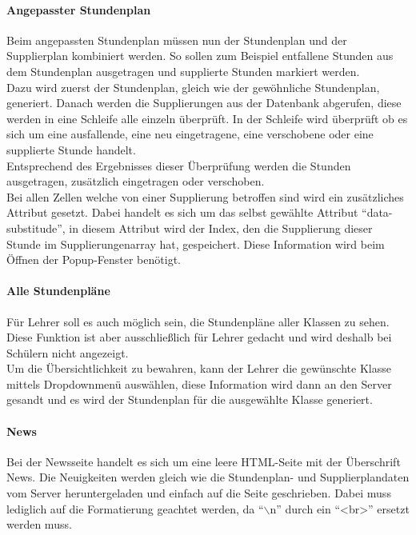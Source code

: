 \paragraph{Angepasster Stundenplan\\}
Beim angepassten Stundenplan müssen nun der Stundenplan und der Supplierplan kombiniert werden. So sollen zum Beispiel entfallene Stunden aus dem Stundenplan ausgetragen und supplierte Stunden markiert werden.\\
Dazu wird zuerst der Stundenplan, gleich wie der gewöhnliche Stundenplan, generiert. Danach werden die Supplierungen aus der Datenbank abgerufen, diese werden in eine Schleife alle einzeln überprüft. In der Schleife wird überprüft ob es sich um eine ausfallende, eine neu eingetragene, eine verschobene oder eine supplierte Stunde handelt.\\ Entsprechend des Ergebnisses dieser Überprüfung werden die Stunden ausgetragen, zusätzlich eingetragen oder verschoben.\\
Bei allen Zellen welche von einer Supplierung betroffen sind wird ein zusätzliches Attribut gesetzt. Dabei handelt es sich um das selbst gewählte Attribut \enquote{data-substitude}, in diesem Attribut wird der Index, den die Supplierung dieser Stunde im Supplierungenarray hat, gespeichert. Diese Information wird beim Öffnen der Popup-Fenster benötigt.\\

\paragraph{Alle Stundenpläne}
Für Lehrer soll es auch möglich sein, die Stundenpläne aller Klassen zu sehen. Diese Funktion ist aber ausschließlich für Lehrer gedacht und wird deshalb bei Schülern nicht angezeigt.\\
Um die Übersichtlichkeit zu bewahren, kann der Lehrer die gewünschte Klasse mittels Dropdownmenü auswählen, diese Information wird dann an den Server gesandt und es wird der Stundenplan für die ausgewählte Klasse generiert.\\


\paragraph{News\\}
Bei der Newsseite handelt es sich um eine leere HTML-Seite mit der Überschrift News. Die Neuigkeiten werden gleich wie die Stundenplan- und Supplierplandaten vom Server heruntergeladen und einfach auf die Seite geschrieben. Dabei muss lediglich auf die Formatierung geachtet werden, da \enquote{$\backslash$n} durch ein \enquote{<br>} ersetzt werden muss.\\

